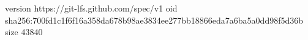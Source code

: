 version https://git-lfs.github.com/spec/v1
oid sha256:700fd1c1f6f16a358da678b98ae3834ee277bb18866eda7a6ba5a0dd98f5d36b
size 43840
